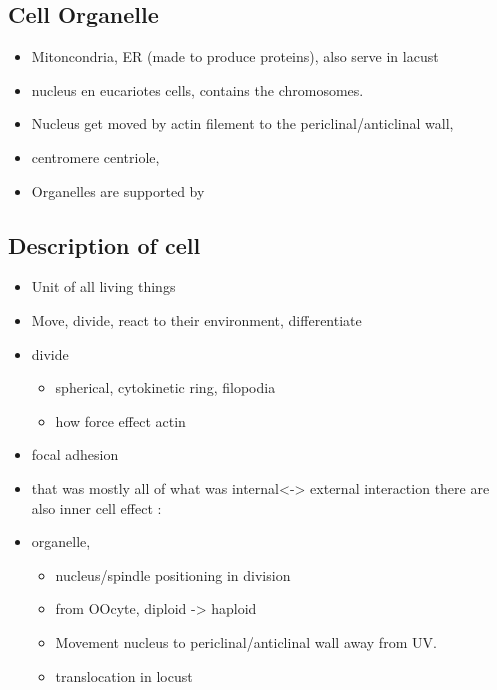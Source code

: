 \documentclass[A4paperpaper,11pt,english]{sphinxmanual}
\begin{document}
\subsection{Cell Organelle}
\label{parts/part1:cell-organelle}\begin{itemize}
\item {} 
Mitoncondria, ER (made to produce proteins), also serve in lacust

\item {} 
nucleus en eucariotes cells, contains the chromosomes.

\item {} 
Nucleus get moved by actin filement to the periclinal/anticlinal wall,

\item {} 
centromere centriole,

\item {} 
Organelles are supported by

\end{itemize}


\subsection{Description of cell}
\label{parts/part1:description-of-cell}\begin{itemize}
\item {} 
Unit of all living things

\item {} 
Move, divide, react to their environment, differentiate

\item {} 
divide
\begin{itemize}
\item {} 
spherical, cytokinetic ring, filopodia

\item {} 
how force effect actin

\end{itemize}

\item {} 
focal adhesion

\item {} 
that was mostly all of what was internal\textless{}-\textgreater{} external interaction there are also inner cell effect :

\item {} 
organelle,
\begin{itemize}
\item {} 
nucleus/spindle positioning in division

\item {} 
from OOcyte, diploid -\textgreater{} haploid

\item {} 
Movement nucleus to periclinal/anticlinal wall away from UV.

\item {} 
translocation in locust

\end{itemize}

\end{itemize}
\end{document}
